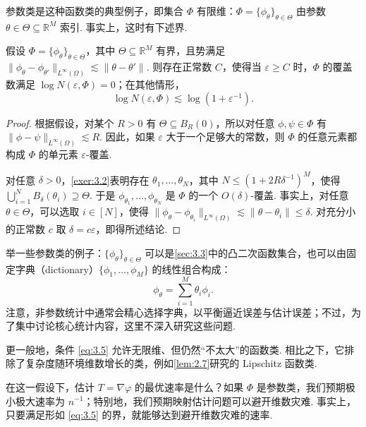 参数类是这种函数类的典型例子，即集合 $\Phi$ 有限维：$\Phi=\{\phi_\theta\}_{\theta\in\Theta}$ 由参数 $\theta\in\Theta\subseteq\mathbb R^M$ 索引. 事实上，这时有下述界.
\begin{lemma}\label{lem:3.5}
假设 $\Phi=\{\phi_\theta\}_{\theta\in\Theta}$，其中 $\Theta\subseteq\mathbb R^M$ 有界，且势满足 $\|\phi_\theta-\phi_{\theta'}\|_{L^\infty(\Omega)}\lesssim\|\theta-\theta'\|$. 则存在正常数 $C$，使得当 $\varepsilon\ge C$ 时，$\Phi$ 的覆盖数满足 $\log N(\varepsilon,\Phi)=0$；在其他情形，
$$\log N(\varepsilon,\Phi)\lesssim\log(1+\varepsilon^{-1}).$$
\end{lemma}
\begin{proof}
根据假设，对某个 $R>0$ 有 $\Theta\subseteq B_R(0)$，所以对任意 $\phi,\psi\in\Phi$ 有 $\|\phi-\psi\|_{L^\infty(\Omega)}\lesssim R$. 因此，如果 $\varepsilon$ 大于一个足够大的常数，则 $\Phi$ 的任意元素都构成 $\Phi$ 的单元素 $\varepsilon$-覆盖.

对任意 $\delta>0$，\autoref{exer:3.2}表明存在 $\theta_1,\ldots,\theta_N$，其中 $N\le(1+2R\delta^{-1})^M$，使得 $\bigcup_{i=1}^N B_\delta(\theta_i)\supseteq\Theta$. 于是 $\phi_{\theta_1},\ldots,\phi_{\theta_N}$ 是 $\Phi$ 的一个 $O(\delta)$-覆盖. 事实上，对任意 $\theta\in\Theta$，可以选取 $i\in[N]$，使得 $\|\phi_\theta-\phi_{\theta_i}\|_{L^\infty(\Omega)}\lesssim\|\theta-\theta_i\|\le\delta$. 对充分小的正常数 $c$ 取 $\delta=c\varepsilon$，即得所述结论.
\end{proof}

举一些参数类的例子：$\{\phi_\theta\}_{\theta\in\Theta}$ 可以是\autoref{sec:3.3}中的凸二次函数集合，也可以由固定字典（dictionary）$\{\phi_1,\ldots,\phi_M\}$ 的线性组合构成：
$$\phi_\theta=\sum_{i=1}^M\theta_i\phi_i.$$
注意，非参数统计中通常会精心选择字典，以平衡逼近误差与估计误差；不过，为了集中讨论核心统计内容，这里不深入研究这些问题.

更一般地，条件 \eqref{eq:3.5} 允许无限维、但仍然“不太大”的函数类. 相比之下，它排除了复杂度随环境维数增长的类，例如\autoref{lem:2.7}研究的 Lipschitz 函数类.

在这一假设下，估计 $T=\nabla\varphi$ 的最优速率是什么？如果 $\Phi$ 是参数类，我们预期极小极大速率为 $n^{-1}$；特别地，我们预期映射估计问题可以避开维数灾难. 事实上，只要满足形如 \eqref{eq:3.5} 的界，就能够达到避开维数灾难的速率.

